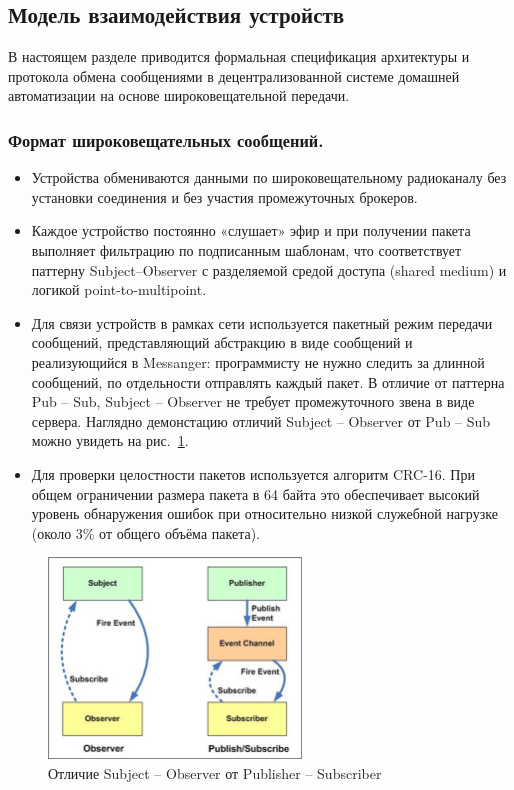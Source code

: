 \documentclass[14pt,a4paper]{extarticle}
\begin{document}
\subsection{Модель взаимодействия устройств}

В настоящем разделе приводится формальная спецификация архитектуры и протокола обмена сообщениями в децентрализованной системе домашней автоматизации на основе широковещательной передачи.

\subsubsection{Формат широковещательных сообщений.}

\begin{itemize}
  \item Устройства обмениваются данными по широковещательному радиоканалу без установки соединения и без участия промежуточных брокеров.
  
  \item Каждое устройство постоянно «слушает» эфир и при получении пакета выполняет фильтрацию по подписанным шаблонам, что соответствует паттерну Subject--Observer с разделяемой
  средой доступа (shared medium) и логикой point-to-multipoint.
  
  \item Для связи устройств в рамках сети используется пакетный режим передачи сообщений, представляющий абстракцию в виде сообщений и реализующийся в Messanger: программисту не
  нужно следить за длинной сообщений, по отдельности отправлять каждый пакет. В отличие от паттерна Pub -- Sub, Subject -- Observer не требует промежуточного звена в виде сервера.
  Наглядно демонстацию отличий Subject -- Observer от Pub -- Sub можно увидеть на рис.~\ref{fig:Observer_vs_pub_sub}.

  \item Для проверки целостности пакетов используется алгоритм CRC-16. При общем ограничении размера пакета в 64 байта это обеспечивает высокий уровень обнаружения ошибок при
  относительно низкой служебной нагрузке (около 3\% от общего объёма пакета).
\end{itemize}

\begin{figure}[H]
    \centering
    \includegraphics[width=0.6\textwidth]{images/Fig08.png}
    \caption{Отличие Subject -- Observer от Publisher -- Subscriber \cite{IMG_observer_vs_pub_sub}}
    \label{fig:Observer_vs_pub_sub}
\end{figure}
\end{document}
